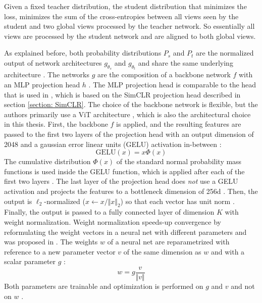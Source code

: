 Given a fixed teacher distribution, the student distribution that minimizes the loss, minimizes the sum of the cross-entropies between all views seen by the student and two global views processed by the teacher network.
So essentially all views are processed by the student network and are aligned to both global views.
\par
As explained before, both probability distributions $P_s$ and $P_t$ are the normalized output of network architectures $g_{\theta_s}$ and $g_{\theta_t}$ and share the same underlying architecture \citep{Caron2021}.
The networks $g$ are the composition of a backbone network $f$ with an MLP projection head $h$ \citep{Caron2021}.
The MLP projection head is comparable to the head that is used in \citep{Caron2020}, which is based on the SimCLR projection head described in section \ref{section: SimCLR}.
The choice of the backbone network is flexible, but the authors primarily use a ViT architecture \citep{Dosovitskiy2020}, which is also the architectural choice in this thesis.
First, the backbone $f$ is applied, and the resulting features are passed to the first two layers of the projection head with an output dimension of 2048 and a gaussian error linear units (GELU) activation in-between \citep{Hendrycks2016b}:
\begin{equation}
\text{GELU}(x) = x \Phi(x)
\end{equation}
The cumulative distribution $\Phi(x)$ of the standard normal probability mass functions is used inside the GELU function, which is applied after each of the first two layers \citep{Hendrycks2016b}.
The last layer of the projection head does \textit{not} use a GELU activation and projects the features to a bottleneck dimension of 256d \citep{Caron2021}.
Then, the output is $\ell_2$-normalized ($x \leftarrow x/\Vert x \Vert_2$) so that each vector has unit norm \citep{Caron2021}.
Finally, the output is passed to a fully connected layer of dimension $K$ with weight normalization.
Weight normalization speeds-up convergence by reformulating the weight vectors in a neural net with different parameters and was proposed in \citep{Salimans2016}.
The weights $w$ of a neural net are reparametrized with reference to a new parameter vector $v$ of the same dimension as $w$ and with a scalar parameter $g$ \citep{Salimans2016}:
\begin{equation}
	w = g \frac{v}{\Vert v \Vert}
\end{equation}
Both parameters are trainable and optimization is performed on $g$ and $v$ and not on $w$ \citep{Salimans2016}.
